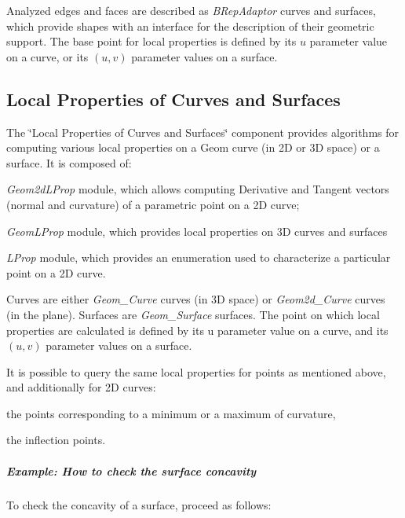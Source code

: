 Analyzed edges and faces are described as {\itshape B\+Rep\+Adaptor} curves and surfaces, which provide shapes with an interface for the description of their geometric support. The base point for local properties is defined by its $u$ parameter value on a curve, or its $(u, v)$ parameter values on a surface.\hypertarget{occt_user_guides__modeling_data_occt_modat_4_2}{}\subsection{Local Properties of Curves and Surfaces}\label{occt_user_guides__modeling_data_occt_modat_4_2}
The \char`\"{}\+Local Properties of Curves and Surfaces\char`\"{} component provides algorithms for computing various local properties on a Geom curve (in 2D or 3D space) or a surface. It is composed of\+:


\begin{DoxyItemize}
\item {\itshape Geom2d\+L\+Prop} module, which allows computing Derivative and Tangent vectors (normal and curvature) of a parametric point on a 2D curve;
\item {\itshape Geom\+L\+Prop} module, which provides local properties on 3D curves and surfaces
\item {\itshape L\+Prop} module, which provides an enumeration used to characterize a particular point on a 2D curve.
\end{DoxyItemize}

Curves are either {\itshape Geom\+\_\+\+Curve} curves (in 3D space) or {\itshape Geom2d\+\_\+\+Curve} curves (in the plane). Surfaces are {\itshape Geom\+\_\+\+Surface} surfaces. The point on which local properties are calculated is defined by its u parameter value on a curve, and its $(u, v)$ parameter values on a surface.

It is possible to query the same local properties for points as mentioned above, and additionally for 2D curves\+:


\begin{DoxyItemize}
\item the points corresponding to a minimum or a maximum of curvature,
\item the inflection points.
\end{DoxyItemize}

\subparagraph*{Example\+: How to check the surface concavity}

To check the concavity of a surface, proceed as follows\+:


